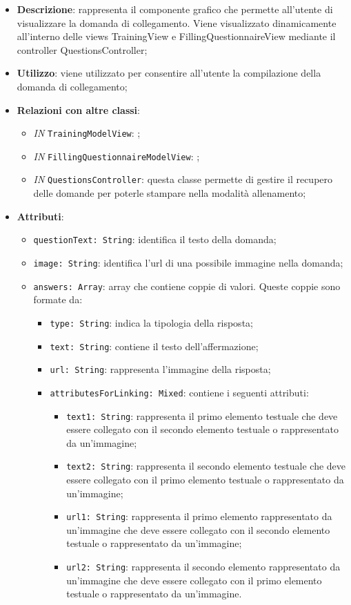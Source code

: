 		\begin{itemize}
			\item \textbf{Descrizione}: rappresenta il componente grafico che permette all'utente di visualizzare la domanda di collegamento. Viene visualizzato dinamicamente all'interno delle views TrainingView e FillingQuestionnaireView mediante il controller QuestionsController;
			\item \textbf{Utilizzo}: viene utilizzato per consentire all'utente la compilazione della domanda di collegamento;
			\item \textbf{Relazioni con altre classi}: 
			\begin{itemize}
				\item \textit{IN} \texttt{TrainingModelView}: ; 
				\item \textit{IN} \texttt{FillingQuestionnaireModelView}: ;
				\item \textit{IN} \texttt{QuestionsController}: questa classe permette di gestire il recupero delle domande per poterle stampare nella modalità allenamento;
			\end{itemize}
			\item \textbf{Attributi}: 
			\begin{itemize}
					\item \texttt{questionText: String}: identifica il testo della domanda;
					\item \texttt{image: String}: identifica l'url di una possibile immagine nella domanda;
					\item \texttt{answers: Array}: array che contiene coppie di valori. Queste coppie sono formate da:
					\begin{itemize}
						\item \texttt{type: String}: indica la tipologia della risposta;
						\item \texttt{text: String}: contiene il testo dell'affermazione;
						\item \texttt{url: String}: rappresenta l'immagine della risposta;
						\item \texttt{attributesForLinking: Mixed}: contiene i seguenti attributi:
						\begin{itemize}
							\item \texttt{text1: String}: rappresenta il primo elemento testuale che deve essere collegato con il secondo elemento testuale o rappresentato da un’immagine;
							\item \texttt{text2: String}: rappresenta il secondo elemento testuale che deve essere collegato con il primo elemento testuale o rappresentato da un’immagine;
							 \item \texttt{url1: String}: rappresenta il primo elemento rappresentato da un'immagine che deve essere collegato con il secondo elemento testuale o rappresentato da un’immagine;
							 \item \texttt{url2: String}: rappresenta il secondo elemento rappresentato da un'immagine che deve essere collegato con il primo elemento testuale o rappresentato da un’immagine.
						\end{itemize}
					\end{itemize}
			\end{itemize}
		\end{itemize}
		
